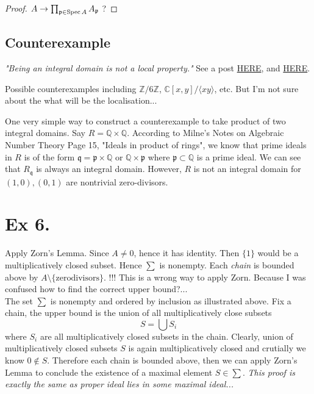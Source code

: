 \begin{proof}
	$A\to \prod_{\mathfrak p\in\operatorname{Spec} A} A_{\mathfrak p}$ ?
\end{proof}

\subsection{Counterexample}
\textit{"Being an integral domain is not a local property."} See a post \href{https://math.stackexchange.com/questions/685844/is-being-an-integral-domain-a-local-property}{HERE}, and \href{https://math.stackexchange.com/questions/2137643/being-an-integral-domain-is-not-a-local-property}{HERE}.

Possible counterexamples including $\mathbb Z/6\mathbb Z$, $\mathbb C[x,y]/\langle xy\rangle$, etc. 
But I'm not sure about the what will be the localisation... 


One very simple way to construct a counterexample to take product of two integral domains. 
Say $R=\mathbb Q\times\mathbb Q$. According to Milne's Notes on Algebraic Number Theory Page 15, "Ideals in product of rings", we know that prime ideals in $R$ is of the form $\mathfrak q=\mathfrak p\times \mathbb Q$ or $\mathbb Q\times\mathfrak p$ where $\mathfrak p\subset\mathbb Q$ is a prime ideal. We can see that $R_{\mathfrak q}$ is always an integral domain. However, $R$ is not an integral domain for $(1,0),(0,1)$ are nontrivial zero-divisors.

\section{Ex 6.}\label{Atiyah Chap 3 Ex 6.}

Apply Zorn's Lemma. Since $A\neq 0$, hence it has identity. Then $\{1\}$ would be a multiplicatively closed subset. Hence $\sum$ is nonempty. Each \textit{chain} is bounded above by $A\setminus\{\text{zerodivisors}\}$. !!!
This is a wrong way to apply Zorn. Because I was confused how to find the correct upper bound?...\\

The set $\sum$ is nonempty and ordered by inclusion as illustrated above. Fix a chain, the upper bound is the union of all multiplicatively close subsets \[S=\bigcup S_i\] where $S_i$ are all multiplicatively closed subsets in the chain. Clearly, union of multiplicatively closed subsets $S$ is again multiplicatively closed and crutially we know $0\notin S$. Therefore each chain is bounded above, then we can apply Zorn's Lemma to conclude the existence of a maximal element $S\in \sum$. \textit{This proof is exactly the same as proper ideal lies in some maximal ideal...}

